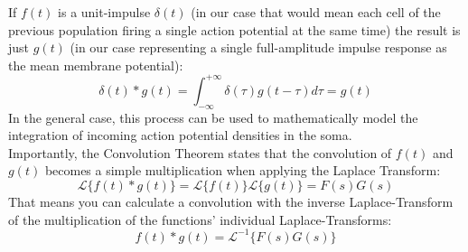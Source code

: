 \begin{remark}[Convolution]
    If $f(t)$ is a unit-impulse $\delta(t)$ (in our case that would mean each cell of the previous population firing a single action potential at the same time) the result is just $g(t)$ (in our case representing a single full-amplitude impulse response as the mean membrane potential):
    \[\delta(t) \ast g(t)= \int_{-\infty}^{+\infty}\delta(\tau)g(t-\tau) d\tau = g(t)\]
    In the general case, this process can be used to mathematically model the integration of incoming action potential densities in the soma.\\[1em]
    Importantly, the Convolution Theorem states that the convolution of $f(t)$ and $g(t)$ becomes a simple multiplication when applying the Laplace Transform:
    \[\mathscr{L}\{f(t) \ast g(t)\}= \mathscr{L}\{f(t)\}\mathscr{L}\{g(t)\} = F(s)G(s)\]
    That means you can calculate a convolution with the inverse Laplace-Transform of the multiplication of the functions' individual Laplace-Transforms:
    \[f(t) \ast g(t)= \mathscr{L}^{-1}\{F(s)G(s)\}\]

\end{remark}

